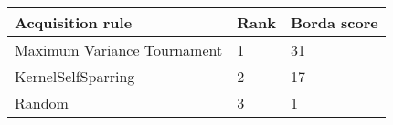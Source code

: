 \begin{tabular}{lll}
Acquisition rule & Rank & Borda score \\ 
\hline 
Maximum Variance Tournament        & 1 & 31 \\ 
KernelSelfSparring \citep{Sui2017} & 2 & 17 \\ 
Random                             & 3 & 1 \\ 
\hline 
\end{tabular}